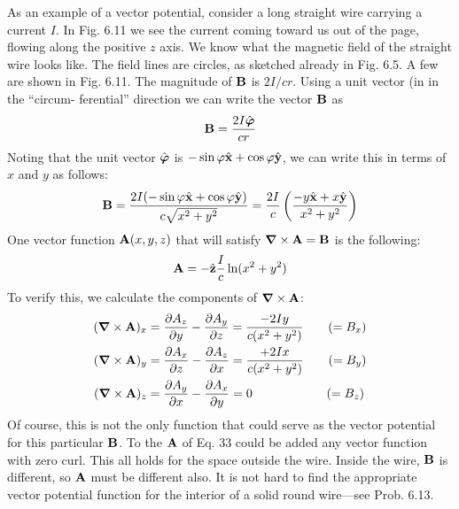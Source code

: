 As an example of a vector potential, consider a long straight wire
carrying a current $I$. In Fig. 6.11 we see the current coming toward
us out of the page, flowing along the positive $z$ axis. We know what
the magnetic field of the straight wire looks like. The field lines are
circles, as sketched already in Fig. 6.5. A few are shown in Fig. 6.11.
The magnitude of $\mathbf{B}$ is $2I/cr$. Using a unit vector (in in the ``circum-
ferential'' direction we can write the vector $\mathbf{B}$ as
\begin{equation}
  \mathbf{B} = \frac{2I\hat{\boldsymbol{\varphi}}}{cr}
\end{equation}
Noting that the unit vector $\hat{\boldsymbol{\varphi}}$ is $-\sin\varphi\hat{\mathbf{x}}+\cos\varphi\hat{\mathbf{y}}$, we can write this
in terms of $x$ and $y$ as follows:
\begin{equation}
  \mathbf{B} = \frac{2I(-\sin\varphi\hat{\mathbf{x}}+\cos\varphi\hat{\mathbf{y}})}{c\sqrt{x^2+y^2}}
         = \frac{2I}{c} \left(\frac{-y\hat{\mathbf{x}}+x\hat{\mathbf{y}}}{x^2+y^2}\right)
\end{equation}
One vector function $\mathbf{A}(x,y,z)$ that will satisfy $\boldsymbol{\nabla}\times\mathbf{A}=\mathbf{B}$ is the
following:
\begin{equation}
  \mathbf{A} = -\hat{\mathbf{z}} \frac{I}{c} \ln(x^2+y^2)
\end{equation}
To verify this, we calculate the components of $\boldsymbol{\nabla}\times\mathbf{A}$:
\begin{align}
\begin{split}
  (\boldsymbol{\nabla}\times\mathbf{A})_x &= \frac{\partial A_z}{\partial y} - \frac{\partial A_y}{\partial z}
                         = \frac{-2Iy}{c(x^2+y^2)} \qquad (=B_x) \\
  (\boldsymbol{\nabla}\times\mathbf{A})_y &= \frac{\partial A_x}{\partial z} - \frac{\partial A_z}{\partial x}
                         = \frac{+2Ix}{c(x^2+y^2)} \qquad (=B_y) \\
  (\boldsymbol{\nabla}\times\mathbf{A})_z &= \frac{\partial A_y}{\partial x} - \frac{\partial A_x}{\partial y}
                         = 0 \qquad\qquad\qquad (=B_z) \\
\end{split}
\end{align}
Of course, this is not the only function that could serve as the vector
potential for this particular $\mathbf{B}$. To the $\mathbf{A}$ of Eq. 33 could be added any
vector function with zero curl. This all holds for the space outside
the wire. Inside the wire, $\mathbf{B}$ is different, so $\mathbf{A}$ must be different also.
It is not hard to find the appropriate vector potential function for
the interior of a solid round wire---see Prob. 6.13.

